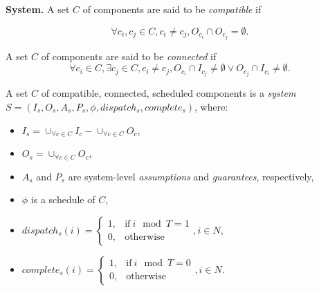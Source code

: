 {\bf System.}
A set $C$ of components are said to be \emph{compatible} if 

\begin{equation*}
\forall c_i,c_j \in C, c_i\neq c_j, O_{c_i} \cap O_{c_j} = \emptyset.
\end{equation*}

A set $C$ of components are said to be \emph{connected} if
\begin{equation*}
\forall c_i \in C, \exists c_j \in C, c_i\neq c_j, O_{c_i} \cap I_{c_j} \neq \emptyset \vee O_{c_j} \cap I_{c_i} \neq \emptyset.
\end{equation*}

A set $C$ of compatible, connected, scheduled components is a \emph{system} $S = (I_s, O_s, A_s, P_s, \phi, dispatch_s, complete_s)$, where:
\begin{itemize}
	\item $I_s = \cup_{\forall c \in C}I_c -  \cup_{\forall c \in C}O_c$,
	\item $O_s = \cup_{\forall c \in C}O_c$,
	\item $A_s$ and $P_s$ are system-level \emph{assumptions} and \emph{guarantees}, respectively,
	\item $\phi$ is a schedule of $C$,	
	\item $dispatch_s (i) = 
	    	\begin{cases}
      		1, & \text{if}\ i \mod T =1 \\
	     	0, & \text{otherwise}
   	 	\end{cases},  i \in N$,
   	\item $complete_s (i) =
   		\begin{cases}
      		1, & \text{if}\ i \mod T = 0 \\
	     	0, & \text{otherwise}
   	 	\end{cases}, i \in N$.
\end{itemize}